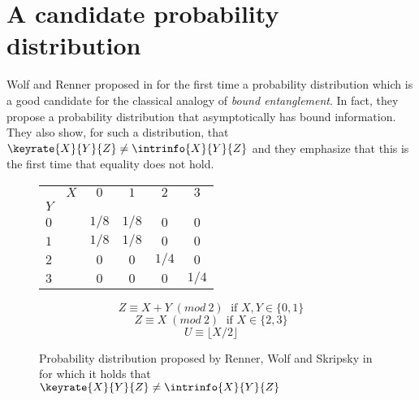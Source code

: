 \section{A candidate probability distribution}
    Wolf and Renner proposed in \cite{RW03} for the first time a probability distribution which is a good candidate for the classical analogy of \emph{bound entanglement}. 
    In fact, they propose a probability distribution that asymptotically has bound information. 
    They also show, for such a distribution, that $\keyrate{X}{Y}{Z} \neq \intrinfo{X}{Y}{Z}$ and they emphasize that this is the first time that equality does not hold.
	\begin{figure}[h!]
	\begin{center}
		\begin{tabular}{|l r||c|c|c|c|}
		    \hline 
		    		 &	$X$ & $0$ & $1$ & $2$ & $3$ \\ 
		    $Y$ &		  &		&			&			&		\\
		    \hline 
		    \hline
		    $0$ &		   & $1/8$ & $1/8$ & $0$ & $0$ \\ 
		    \hline 
		    $1$ &		   & $1/8$ & $1/8$ & $0$ & $0$ \\ 
		    \hline 
		    $2$ &		   & $0$ & $0$ & $1/4$ & $0$ \\ 
		    \hline 
		    $3$ &		   & $0$ & $0$ & $0$ & $1/4$ \\ 
		    \hline 
		  \end{tabular} 
	\end{center}
		

		
	    $$Z \equiv X + Y\; (mod\: 2)\; \text{ if } X,Y \in \{ 0,1\}$$ 
	    $$Z \equiv X\; (mod\: 2)\; \text{ if } X \in \{ 2,3\}$$ 
	    $$U \equiv \lfloor X/2 \rfloor $$
	    \caption{Probability distribution proposed by Renner, Wolf and Skripsky in \cite{RW03} for which it holds that $\keyrate{X}{Y}{Z} \neq \intrinfo{X}{Y}{Z}$}
	    \label{Tab:candidate}
	\end{figure}	    
	
